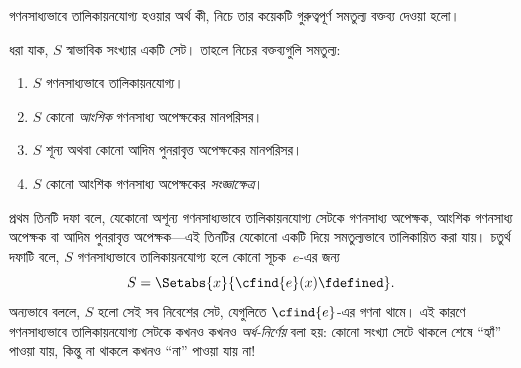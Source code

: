 \documentclass[../../../include/open-logic-section]{subfiles}
\begin{document}



গণনসাধ্যভাবে তালিকায়নযোগ্য হওয়ার অর্থ কী, নিচে তার কয়েকটি গুরুত্বপূর্ণ
সমতুল্য বক্তব্য দেওয়া হলো।

\begin{thm}
ধরা যাক, $S$ স্বাভাবিক সংখ্যার একটি সেট। তাহলে নিচের বক্তব্যগুলি সমতুল্য:
\begin{enumerate}
\item{} $S$ গণনসাধ্যভাবে তালিকায়নযোগ্য।
\item{} $S$ কোনো \emph{আংশিক} গণনসাধ্য অপেক্ষকের মানপরিসর।
\item{} $S$ শূন্য অথবা কোনো আদিম পুনরাবৃত্ত অপেক্ষকের মানপরিসর।
\item{} $S$ কোনো আংশিক গণনসাধ্য অপেক্ষকের
\emph{সংজ্ঞাক্ষেত্র}।
\end{enumerate}
\end{thm}

\begin{explain}
প্রথম তিনটি দফা বলে, যেকোনো অশূন্য গণনসাধ্যভাবে তালিকায়নযোগ্য সেটকে
গণনসাধ্য অপেক্ষক, আংশিক গণনসাধ্য অপেক্ষক বা আদিম পুনরাবৃত্ত অপেক্ষক—এই
তিনটির যেকোনো একটি দিয়ে সমতুল্যভাবে তালিকায়িত করা যায়। চতুর্থ দফাটি
বলে, $S$ গণনসাধ্যভাবে তালিকায়নযোগ্য হলে কোনো সূচক~$e$-এর জন্য
\[
S = \Setabs{x}{\cfind{e}(x) \fdefined}.
\]
অন্যভাবে বললে, $S$ হলো সেই সব নিবেশের সেট, যেগুলিতে $\cfind{e}$-এর গণনা
থামে। এই কারণে গণনসাধ্যভাবে তালিকায়নযোগ্য সেটকে কখনও কখনও
\emph{অর্ধ-নির্ণেয়} বলা হয়: কোনো সংখ্যা সেটে থাকলে শেষে “হ্যাঁ” পাওয়া
যায়, কিন্তু না থাকলে কখনও “না” পাওয়া যায় না!{}
\end{explain}
\end{document}
